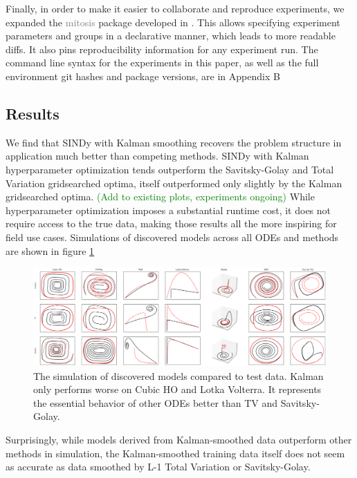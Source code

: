 \documentclass{article}
\newcommand{\gray}[1]{\textcolor{gray}{#1}}
\newcommand{\green}[1]{\textcolor{green}{#1}}
\begin{document}
Finally, in order to make it easier to collaborate and reproduce experiments, we expanded the \gray{mitosis} package developed in \cite{Stevens-Haas2022}.  This allows specifying experiment parameters and groups in a declarative manner, which leads to more readable diffs.  It also pins reproducibility information for any experiment run.  The command line syntax for the experiments in this paper, as well as the full environment git hashes and package versions, are in Appendix B

\subsection{Results}

We find that SINDy with Kalman smoothing recovers the problem structure in application much better than competing methods.  SINDy with Kalman hyperparameter optimization tends outperform the Savitsky-Golay and Total Variation gridsearched optima, itself outperformed only slightly by the Kalman gridsearched optima.  \green{(Add to existing plots, experiments ongoing)}  While hyperparameter optimization imposes a substantial runtime cost, it does not require access to the true data, making those results all the more inspiring for field use cases.  Simulations of discovered models across all ODEs and methods are shown in figure \ref{fig:test}
\begin{figure}[h]
    \label{fig:test}
    \includegraphics[width=\textwidth]{images/summary_test}
    \caption{The simulation of discovered models compared to test data.  Kalman only performs worse on Cubic HO and Lotka Volterra.  It represents the essential behavior of other ODEs better than TV and Savitsky-Golay.}
\end{figure}

Surprisingly, while models derived from Kalman-smoothed data outperform other methods in simulation, the Kalman-smoothed training data itself does not seem as accurate as data smoothed by L-1 Total Variation or Savitsky-Golay.
\end{document}

